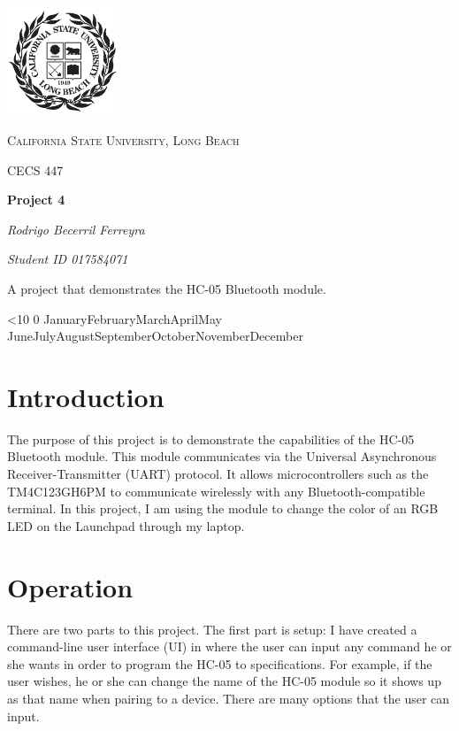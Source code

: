 \documentclass{article}
\renewcommand{\today}{\ifnum\number\day<10 0\fi \number\day \space%
\ifcase \month \or January\or February\or March\or April\or May%
\or June\or July\or August\or September\or October\or November\or December\fi\space%
\number \year}
\begin{document}
\begin{titlepage}
	\centering
	\includegraphics[width=0.25\textwidth]{Images/247px-CSU-Longbeach_seal}\par\vspace{1cm}
	{\scshape\Large California State University, Long Beach \par}
	\vspace{1cm}
	{\scshape\Large CECS 447\par}
	\vspace{1.5cm}
	{\huge\bfseries Project 4\par}
	\vspace{2cm}
    {\Large\itshape Rodrigo Becerril Ferreyra\par}
    {\itshape\Large Student ID 017584071 \par}
	\vfill
    A project that demonstrates the HC-05
	Bluetooth module.

	\vfill

	{\large \today\par}
\end{titlepage}

\section{Introduction}
The purpose of this project is to demonstrate the
capabilities of the HC-05 Bluetooth module. This module
communicates via the Universal Asynchronous
Receiver-Transmitter (UART) protocol. It allows
microcontrollers such as the TM4C123GH6PM to communicate
wirelessly with any Bluetooth-compatible terminal. In this
project, I am using the module to change the color of an
RGB LED on the Launchpad through my laptop.

\section{Operation}
There are two parts to this project. The first part is
setup: I have created a command-line user interface (UI)
in where
the user can input any command he or she wants in order to
program the HC-05 to specifications. For example, if the
user wishes, he or she can change the name of the HC-05
module so it shows up as that name when pairing to a device.
There are many options that the user can input.
\end{document}
